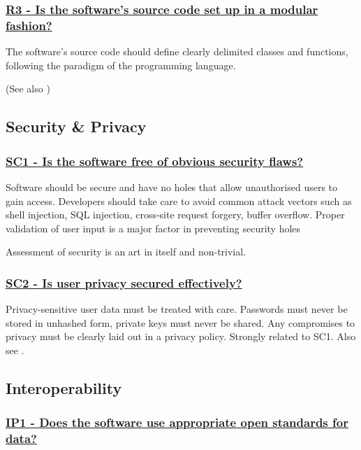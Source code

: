 \documentclass[a4paper,11pt]{article}
\newcommand{\criterion}[2]{\subsubsection*{\underline{#1 - #2}}\label{id:#1}}
\newcommand\CheckTable{%
  \begin{tabular}{ccccc}
    No & Minimal & Adequate & Good & Perfect \\
    0 & 1 & 2 & 3 & 4 \\
    \hline
    $\square$ & $\square$ & $\square$ & $\square$ & $\square$ \\
  \end{tabular}%
}
\newcommand{\refcrit}[1]{%
 \framebox[1.1\width]{\hyperref[id:#1]{#1}}
}
\begin{document}

\newcommand{\rThreeID}{R3}
\newcommand{\rThreeText}{Is the software's source code set up in a modular fashion?}
\criterion{\rThreeID}{\rThreeText}
%
%
%

The software's source code should define clearly delimited classes and
functions, following the paradigm of the programming language. 

(See also \refcrit{AN1})


\subsection{Security \& Privacy}\label{sec:sec}

\newcommand{\scOneID}{SC1}
\newcommand{\scOneText}{Is the software free of obvious security flaws?}
\criterion{\scOneID}{\scOneText}

Software should be secure and have no holes that allow unauthorised users to
gain access. Developers should take care to avoid common attack vectors such as
shell injection, SQL injection, cross-site request forgery, buffer overflow.
Proper validation of user input is a major factor in preventing security holes

Assessment of security is an art in itself and non-trivial. 


\newcommand{\scTwoID}{SC2}
\newcommand{\scTwoText}{Is user privacy secured effectively?}
\criterion{\scTwoID}{\scTwoText}

Privacy-sensitive user data must be treated with care. Passwords must never be
stored in unhashed form, private keys must never be shared. Any compromises to
privacy must be clearly laid out in a privacy policy.  Strongly related to SC1.
Also see \refcrit{AC3}.


\subsection{Interoperability}\label{sec:int}

\newcommand{\ipOneID}{IP1}
\newcommand{\ipOneText}{Does the software use appropriate open standards for data?}
\criterion{\ipOneID}{\ipOneText}
\end{document}
